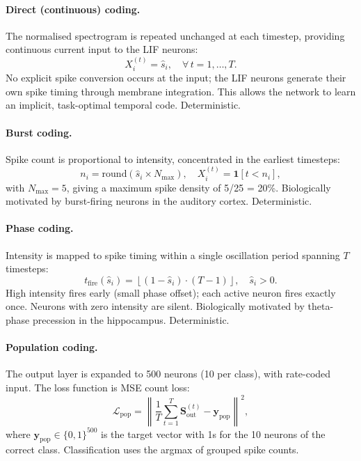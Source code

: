 \paragraph{Direct (continuous) coding.}
The normalised spectrogram is repeated unchanged at each timestep, providing continuous current input to the LIF neurons:
\begin{equation}
\label{eq:direct}
X_i^{(t)} = \hat{s}_i, \quad \forall\, t = 1, \ldots, T.
\end{equation}
No explicit spike conversion occurs at the input; the LIF neurons generate their own spike timing through membrane integration. This allows the network to learn an implicit, task-optimal temporal code. Deterministic.

\paragraph{Burst coding.}
Spike count is proportional to intensity, concentrated in the earliest timesteps:
\begin{equation}
\label{eq:burst}
n_i = \text{round}(\hat{s}_i \times N_{\max}), \quad X_i^{(t)} = \mathbf{1}[t < n_i],
\end{equation}
with $N_{\max} = 5$, giving a maximum spike density of 5/25 = 20\%. Biologically motivated by burst-firing neurons in the auditory cortex. Deterministic.

\paragraph{Phase coding.}
Intensity is mapped to spike timing within a single oscillation period spanning $T$ timesteps:
\begin{equation}
\label{eq:phase}
t_{\text{fire}}(\hat{s}_i) = \left\lfloor (1 - \hat{s}_i) \cdot (T - 1) \right\rfloor, \quad \hat{s}_i > 0.
\end{equation}
High intensity fires early (small phase offset); each active neuron fires exactly once. Neurons with zero intensity are silent. Biologically motivated by theta-phase precession in the hippocampus. Deterministic.

\paragraph{Population coding.}
The output layer is expanded to 500 neurons (10 per class), with rate-coded input. The loss function is MSE count loss:
\begin{equation}
\label{eq:population}
\mathcal{L}_{\text{pop}} = \left\lVert \frac{1}{T}\sum_{t=1}^{T} \mathbf{S}_{\text{out}}^{(t)} - \mathbf{y}_{\text{pop}} \right\rVert^2,
\end{equation}
where $\mathbf{y}_{\text{pop}} \in \{0, 1\}^{500}$ is the target vector with 1s for the 10 neurons of the correct class. Classification uses the argmax of grouped spike counts.

